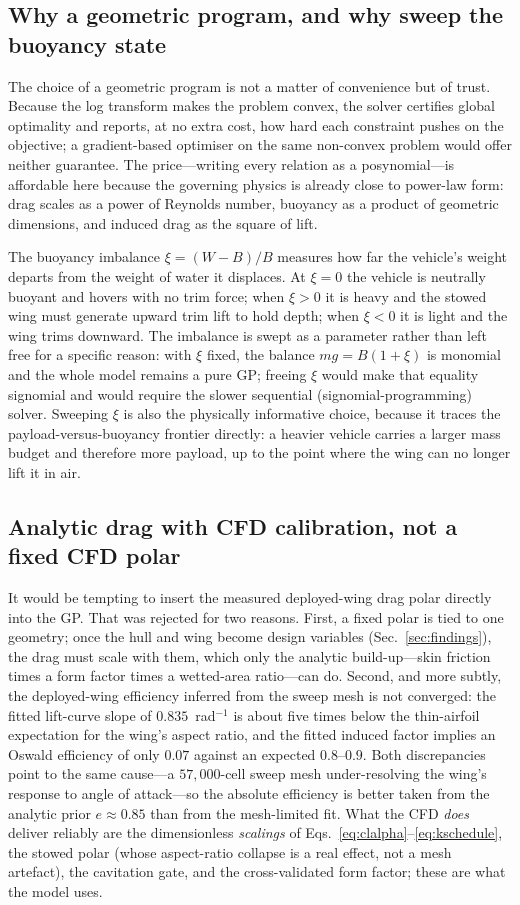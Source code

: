 \documentclass[conf]{new-aiaa}
\begin{document}
\subsection{Why a geometric program, and why sweep the buoyancy state}
The choice of a geometric program is not a matter of convenience but of trust. Because the log
transform makes the problem convex, the solver certifies global optimality and reports, at no extra
cost, how hard each constraint pushes on the objective; a gradient-based optimiser on the same
non-convex problem would offer neither guarantee. The price---writing every relation as a
posynomial---is affordable here because the governing physics is already close to power-law form:
drag scales as a power of Reynolds number, buoyancy as a product of geometric dimensions, and induced
drag as the square of lift.

The buoyancy imbalance $\xi=(W-B)/B$ measures how far the vehicle's weight departs from the weight of
water it displaces. At $\xi=0$ the vehicle is neutrally buoyant and hovers with no trim force; when
$\xi>0$ it is heavy and the stowed wing must generate upward trim lift to hold depth; when $\xi<0$ it
is light and the wing trims downward. The imbalance is swept as a parameter rather than left free for
a specific reason: with $\xi$ fixed, the balance $mg=B(1+\xi)$ is monomial and the whole model
remains a pure GP; freeing $\xi$ would make that equality signomial and would require the slower
sequential (signomial-programming) solver. Sweeping $\xi$ is also the physically informative choice,
because it traces the payload-versus-buoyancy frontier directly: a heavier vehicle carries a larger
mass budget and therefore more payload, up to the point where the wing can no longer lift it in air.

\subsection{Analytic drag with CFD calibration, not a fixed CFD polar}
It would be tempting to insert the measured deployed-wing drag polar directly into the GP. That was
rejected for two reasons. First, a fixed polar is tied to one geometry; once the hull and wing become
design variables (Sec.~\ref{sec:findings}), the drag must scale with them, which only the analytic
build-up---skin friction times a form factor times a wetted-area ratio---can do. Second, and more
subtly, the deployed-wing efficiency inferred from the sweep mesh is not converged: the fitted
lift-curve slope of $0.835$~rad$^{-1}$ is about five times below the thin-airfoil expectation for the
wing's aspect ratio, and the fitted induced factor implies an Oswald efficiency of only $0.07$
against an expected $0.8$--$0.9$. Both discrepancies point to the same cause---a $57{,}000$-cell
sweep mesh under-resolving the wing's response to angle of attack---so the absolute efficiency is
better taken from the analytic prior $e\approx0.85$ than from the mesh-limited fit. What the CFD
\emph{does} deliver reliably are the dimensionless \emph{scalings} of
Eqs.~\eqref{eq:clalpha}--\eqref{eq:kschedule}, the stowed polar (whose aspect-ratio collapse is a
real effect, not a mesh artefact), the cavitation gate, and the cross-validated form factor; these
are what the model uses.
\end{document}
